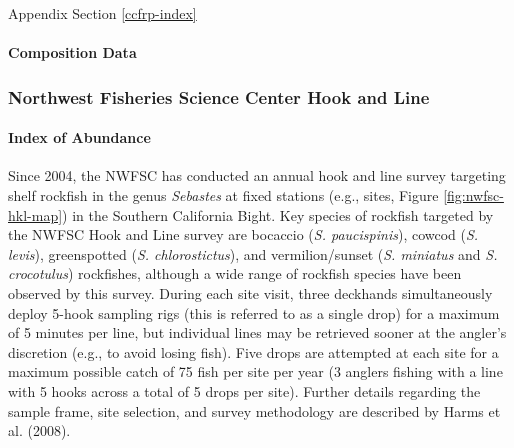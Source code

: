 \documentclass[11pt,
  english,
  letterpaper,
]{article}
\begin{document}
Appendix Section \ref{ccfrp-index}

\hypertarget{composition-data-2}{%
\paragraph{Composition Data}\label{composition-data-2}}

\hypertarget{northwest-fisheries-science-center-hook-and-line}{%
\subsubsection{Northwest Fisheries Science Center Hook and Line}\label{northwest-fisheries-science-center-hook-and-line}}

\hypertarget{index-of-abundance-1}{%
\paragraph{Index of Abundance}\label{index-of-abundance-1}}

\hfill\break

Since 2004, the NWFSC has conducted an annual hook and line survey targeting shelf rockfish in the genus \emph{Sebastes} at fixed stations (e.g., sites, Figure \ref{fig:nwfsc-hkl-map}) in the Southern California Bight. Key species of rockfish targeted by the NWFSC Hook and Line survey are bocaccio (\emph{S. paucispinis}), cowcod (\emph{S. levis}), greenspotted (\emph{S. chlorostictus}), and vermilion/sunset (\emph{S. miniatus} and \emph{S. crocotulus}) rockfishes, although a wide range of rockfish species have been observed by this survey. During each site visit, three deckhands simultaneously deploy 5-hook sampling rigs (this is referred to as a single drop) for a maximum of 5 minutes per line, but individual lines may be retrieved sooner at the angler's discretion (e.g., to avoid losing fish). Five drops are attempted at each site for a maximum possible catch of 75 fish per site per year (3 anglers fishing with a line with 5 hooks across a total of 5 drops per site). Further details regarding the sample frame, site selection, and survey methodology are described by Harms et al. (2008).
\end{document}
